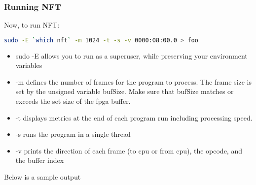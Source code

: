 \subsubsection{Running NFT}
Now, to run NFT:
\begin{lstlisting}[language=bash]
sudo -E `which nft` -m 1024 -t -s -v 0000:08:00.0 > foo
\end{lstlisting}
\begin{itemize}

\item sudo -E allows you to run as a superuser, while preserving your environment variables
\item -m defines the number of frames for the program to process.  The frame size is set by the unsigned variable bufSize.  Make sure that bufSize matches or exceeds the set size of the fpga buffer.
\item -t displays metrics at the end of each program run including processing speed.
\item -s runs the program in a single thread
\item -v prints the direction of each frame (to cpu or from cpu), the opcode, and the buffer index

\end{itemize}
Below is a sample output
